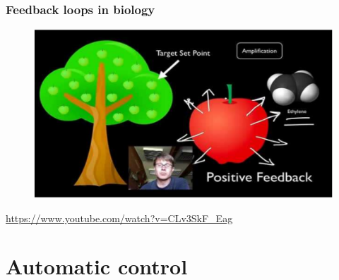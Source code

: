 \documentclass{beamer}
\begin{document}
\begin{frame}
\frametitle{Feedback loops in biology}
\begin{figure}
\includegraphics[width=1\linewidth]{feedback_biology}
\end{figure}
\bigskip
\url{https://www.youtube.com/watch?v=CLv3SkF_Eag}
\end{frame}


%
%
%
%
%
%


\section{Automatic control} 
\end{document}
